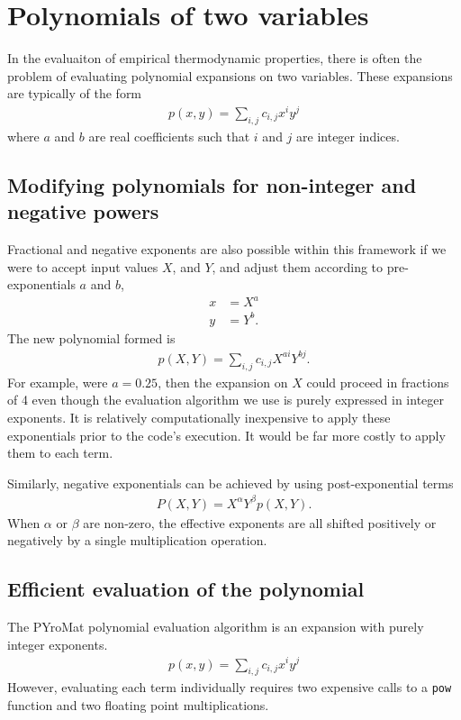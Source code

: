 \documentclass[twocolumn,letterpaper,11pt]{article}
\begin{document}
\section{Polynomials of two variables}
In the evaluaiton of empirical thermodynamic properties, there is often the problem of evaluating polynomial expansions on two variables.  These expansions are typically of the form
\begin{align}
p(x,y) = \sum_{i,j} c_{i,j} x^i y^j\label{eqn:general}
\end{align}
where $a$ and $b$ are real coefficients such that $i$ and $j$ are integer indices.

\subsection{Modifying polynomials for non-integer and negative powers}
Fractional and negative exponents are also possible within this framework if we were to accept input values $X$, and $Y$, and adjust them according to pre-exponentials $a$ and $b$,
\begin{align}
x &= X^a\\
y &= Y^b.
\end{align}
The new polynomial formed is
\begin{align}
p(X,Y) = \sum_{i,j} c_{i,j} X^{ai} Y^{bj}.
\end{align}
For example, were $a=0.25$, then the expansion on $X$ could proceed in fractions of 4 even though the evaluation algorithm we use is purely expressed in integer exponents.  It is relatively computationally inexpensive to apply these exponentials prior to the code's execution.  It would be far more costly to apply them to each term.

Similarly, negative exponentials can be achieved by using post-exponential terms
\begin{align}
P(X,Y) = X^\alpha Y^\beta p(X,Y).
\end{align}
When $\alpha$ or $\beta$ are non-zero, the effective exponents are all shifted positively or negatively by a single multiplication operation.

\subsection{Efficient evaluation of the polynomial}

The PYroMat polynomial evaluation algorithm is an expansion with purely integer exponents.
\begin{align}
p(x,y) = \sum_{i,j} c_{i,j} x^i y^j
\end{align}
However, evaluating each term individually requires two expensive calls to a \verb|pow| function and two floating point multiplications.
\end{document}
